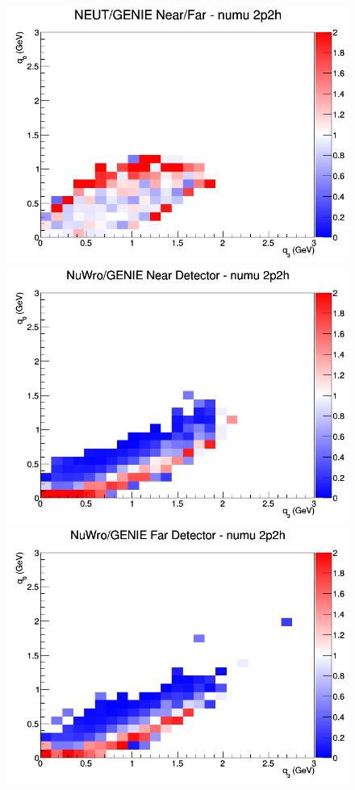 \begin{figure}[h]
\endminipage
{}
\includegraphics[width=\linewidth]{eff_q0_q3/GAr/ratios/2p2h_NEUT_GENIE_numu_NF_q3_q0.png}
\endminipage
\newline
{}
\includegraphics[width=\linewidth]{eff_q0_q3/GAr/ratios/2p2h_NuWro_GENIE_numu_near_q3_q0.png}
\endminipage
{}
\includegraphics[width=\linewidth]{eff_q0_q3/GAr/ratios/2p2h_NuWro_GENIE_numu_far_q3_q0.png}

\end{figure}
